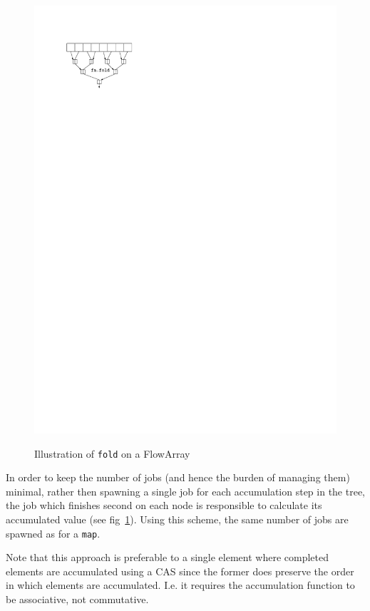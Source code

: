 \documentclass[runningheads,a4paper,fleqn]{llncs}
\begin{document}
\begin{figure}
{    \includegraphics{fa-fold-calc}%
    \label{fig:fa-fold-calc}}
  \caption{Illustration of \texttt{fold} on a FlowArray}
\end{figure}

In order to keep the number of jobs (and hence the burden of managing
them) minimal, rather then spawning a single job for each accumulation
step in the tree, the job which finishes second on each node is
responsible to calculate its accumulated value (see
fig~\ref{fig:fa-fold-calc}). Using this scheme, the 
same number of jobs are spawned as for a \texttt{map}.

Note that this approach is preferable to a single element where
completed elements are accumulated using a CAS since the former
does preserve the order in which elements are accumulated. I.e. it
requires the accumulation function to be associative, not
commutative.
\end{document}
